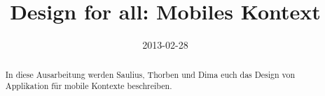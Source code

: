 \documentclass[]{article}
\title{Design for all: Mobiles Kontext}
\author{  }
\date{2013-02-28}
\begin{document}
\ifpdf
{}
\else
{}
\fi

\maketitle


\begin{abstract}
	In diese Ausarbeitung werden Saulius, Thorben und Dima euch das Design von Applikation für mobile Kontexte beschreiben.
\end{abstract}






\printbibliography
\end{document}
